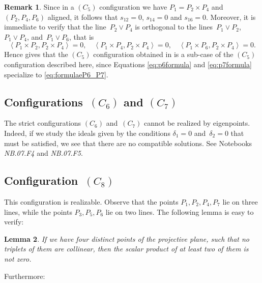 \documentclass[a4paper, 11pt, reqno]{amsart}
\theoremstyle{plain}
\newtheorem{lemma}{Lemma}[section]
\theoremstyle{definition}
\newtheorem{rmk}[lemma]{Remark}
\newcommand{\nb}[2]{\textsl{{NB}.{#1}.{#2}}}
\newcommand{\scl}[2]{\left\langle {#1}, {#2} \right\rangle}
\begin{document}
\begin{rmk}
\label{remark:C5rk8}
Since in a $(C_5)$ configuration we have
$P_1 = P_2 \times P_4$ and $(P_2, P_4, P_6)$ aligned, it follows that $s_{12} = 0$, $s_{14} = 0$ and $s_{16} = 0$.
Moreover, it is
immediate to verify that the line~$P_2 \vee P_4$ is orthogonal to the
lines~$P_1 \vee P_2$, $P_1 \vee P_4$, and~$P_1 \vee P_6$, that is
%
\[
  \scl{P_1 \times P_2}{P_2 \times P_4} = 0, \quad
  \scl{P_1 \times P_4}{P_2 \times P_4} = 0, \quad
  \scl{P_1 \times P_6}{P_2 \times P_4} = 0.
\]
Hence  gives that the $(C_5)$ configuration obtained in  is a sub-case of the $(C_5)$ configuration described here, since Equations \eqref{eq:p6formula} and \eqref{eq:p7formula} specialize to \eqref{eq:formulaeP6_P7}.
%
\end{rmk}


\subsection*{Configurations~\texorpdfstring{$(C_6)$}{C6} and \texorpdfstring{$(C_7)$}{C7}}

The strict configurations $(C_6)$ and~$(C_7)$ cannot be realized by eigenpoints.
Indeed, if we study the ideals given by the conditions
$\delta_1=0$ and~$\delta_2=0$ that must be satisfied,
we see that there are no compatible solutions.
See Notebooks \nb{07}{F4} and \nb{07}{F5}.

\subsection*{Configuration~\texorpdfstring{$(C_8)$}{C8}}
This configuration is realizable.
Observe that the points $P_1, P_2, P_4, P_7$ lie on three lines, while the points
$P_3, P_5, P_6$ lie on two lines.
The following lemma is easy to verify:

\begin{lemma}
\label{lemma:6ortog}
If we have four distinct points of the projective
plane, such that no triplets of them are collinear, then the scalar
product of at least two of them is not zero.
\end{lemma}

Furthermore:
\end{document}

